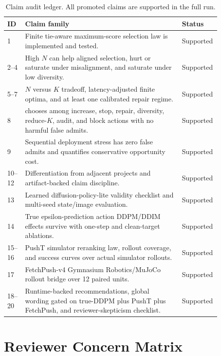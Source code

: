 \begin{table}[H]
\caption{Claim audit ledger. All promoted claims are supported in the full run.}
\label{tab:claim-ledger}
\centering
\small
\begin{tabular}{@{}p{0.07\linewidth}p{0.70\linewidth}p{0.10\linewidth}@{}}
\toprule
ID & Claim family & Status \\
\midrule
1 & Finite tie-aware maximum-score selection law is implemented and tested. & Supported \\
2--4 & High $N$ can help aligned selection, hurt or saturate under misalignment, and saturate under low diversity. & Supported \\
5--7 & $N$ versus $K$ tradeoff, latency-adjusted finite optima, and at least one calibrated repair regime. & Supported \\
8 & \ats{} chooses among increase, stop, repair, diversity, reduce-$K$, audit, and block actions with no harmful false admits. & Supported \\
9 & Sequential deployment stress has zero false admits and quantifies conservative opportunity cost. & Supported \\
10--12 & Differentiation from adjacent projects and artifact-backed claim discipline. & Supported \\
13 & Learned diffusion-policy-lite validity checklist and multi-seed state/image evaluation. & Supported \\
14 & True epsilon-prediction action DDPM/DDIM effects survive with one-step and clean-target ablations. & Supported \\
15--16 & PushT simulator reranking law, rollout coverage, and success curves over actual simulator rollouts. & Supported \\
17 & FetchPush-v4 Gymnasium Robotics/MuJoCo rollout bridge over 12 paired units. & Supported \\
18--20 & Runtime-backed recommendations, global wording gated on true-DDPM plus PushT plus FetchPush, and reviewer-skepticism checklist. & Supported \\
\bottomrule
\end{tabular}
\end{table}

\section{Reviewer Concern Matrix}
\label{app:concerns}

